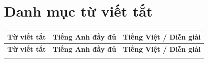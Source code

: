 \chapter*{Danh mục từ viết tắt}

\renewcommand{\arraystretch}{1.25}
\begin{longtable}{p{2.2cm} p{5.6cm} p{6.4cm}}
  \toprule
  \textbf{Từ viết tắt} & \textbf{Tiếng Anh đầy đủ} & \textbf{Tiếng Việt / Diễn giải} \\
  \midrule
  \endfirsthead

  \toprule
  \textbf{Từ viết tắt} & \textbf{Tiếng Anh đầy đủ} & \textbf{Tiếng Việt / Diễn giải} \\
  \midrule
  \endhead

  \bottomrule
  \endfoot


\end{longtable}
